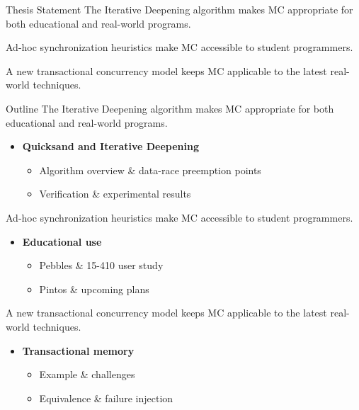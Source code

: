 \documentclass[xcolor=dvipsnames]{beamer}
\newcommand\hilight[2]{\color{#1}#2\color{black}}
\begin{document}

\begin{frame}{Thesis Statement}
	The Iterative Deepening algorithm makes MC appropriate for both educational and real-world programs.
	\vspace{4.14em}

	Ad-hoc synchronization heuristics make MC accessible to student programmers.
	\vspace{4.14em}

	A new transactional concurrency model keeps MC applicable to the latest real-world techniques.
	\vspace{4.14em}
\end{frame}
\begin{frame}{Outline}
	\hilight{gray}{The Iterative Deepening algorithm makes MC appropriate for both educational and real-world programs.} \\
	\begin{itemize}
		\item {\bf Quicksand and Iterative Deepening}
		\begin{itemize}
			\item Algorithm overview \& data-race preemption points
			\item Verification \& experimental results
		\end{itemize}
	\end{itemize}
	\hilight{gray}{Ad-hoc synchronization heuristics make MC accessible to student programmers.} \\
	\begin{itemize}
		\item {\bf Educational use}
		\begin{itemize}
			\item Pebbles \& 15-410 user study
			\item Pintos \& upcoming plans
		\end{itemize}
	\end{itemize}

	\hilight{gray}{A new transactional concurrency model keeps MC applicable to the latest real-world techniques.} \\
	\begin{itemize}
		\item {\bf Transactional memory}
		\begin{itemize}
			\item Example \& challenges
			\item Equivalence \& failure injection
		\end{itemize}
	\end{itemize}
\end{frame}
\end{document}
